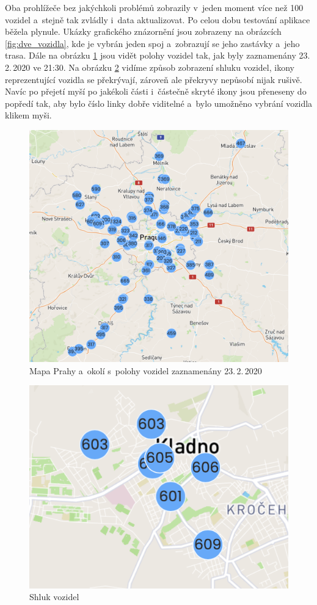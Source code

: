 \bigbreak

Oba prohlížeče bez jakýchkoli problémů zobrazily v~jeden moment více než 100 vozidel a~stejně tak zvládly i~data aktualizovat. Po celou dobu testování aplikace běžela plynule. Ukázky grafického znázornění jsou zobrazeny na obrázcích \ref{fig:dve_vozidla}, kde je vybrán jeden spoj a~zobrazují se jeho zastávky a~jeho trasa. Dále na obrázku \ref{fig:big_picture} jsou vidět polohy vozidel tak, jak byly zaznamenány 23.\,2.\,2020 ve 21:30. Na obrázku \ref{fig:cluster} vidíme způsob zobrazení shluku vozidel, ikony reprezentující vozidla se překrývají, zároveň ale překryvy nepůsobí nijak rušivě. Navíc po přejetí myší po jakékoli části i~částečně skryté ikony jsou přeneseny do popředí tak, aby bylo číslo linky dobře viditelné a~bylo umožněno vybrání vozidla klikem myši.


\begin{figure}
   \centering
 \includegraphics[width=0.7\linewidth]{../img/big_picture.png}
 \caption{Mapa Prahy a~okolí s~polohy vozidel zaznamenány 23.\,2.\,2020}
 \label{fig:big_picture}
\end{figure}


\begin{figure}
   \centering
 \includegraphics[width=0.3\linewidth]{../img/cluster.png}
 \caption{Shluk vozidel}
 \label{fig:cluster}
\end{figure}


\bigbreak


